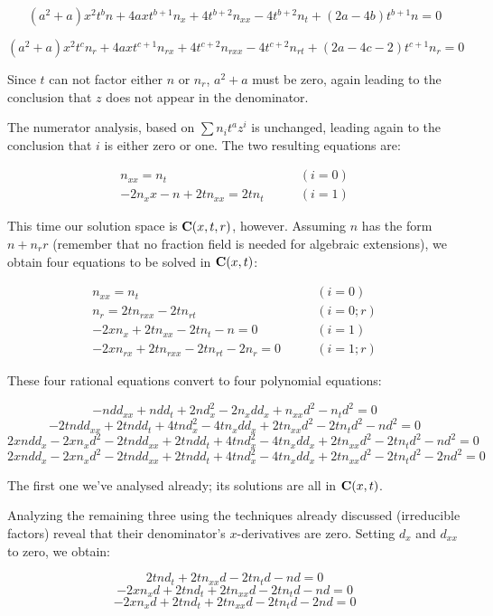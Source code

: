 \documentclass{article}
\newcommand{\C}{\ensuremath{{\bf C}}}
\begin{document}
$$(a^{2} +a)x^{2}t^{b}n +4axt^{b +1}n_{x} +4t^{b +2}n_{xx} -4t^{b +2}n_{t} +(2a -4b)t^{b +1}n = 0$$

$$(a^{2} +a)x^{2}t^{c}n_r +4axt^{c +1}n_{rx} +4t^{c +2}n_{rxx} -4t^{c +2}n_{rt} +(2a -4c -2)t^{c +1}n_r = 0$$

Since $t$ can not factor either $n$ or $n_r$, $a^2+a$ must be zero, again
leading to the conclusion that $z$ does not appear in the denominator.

The numerator analysis, based on $\sum n_i t^a z^i$ is unchanged, leading
again to the conclusion that $i$ is either zero or one.  The two resulting
equations are:

\begin{align*}
n_{xx} = n_t   & \qquad (i=0) \\
-2n_x x - n + 2 t n_{xx} = 2 t n_t  &  \qquad (i=1)
\end{align*}

This time our solution space is $\C(x,t,r)$, however.  Assuming $n$
has the form $n + n_r r$ (remember that no fraction field is needed
for algebraic extensions), we obtain four equations to be solved in $\C(x,t)$:

\begin{align*}
n_{xx} = n_t  & \qquad (i=0) \\
n_r = 2tn_{rxx} -2tn_{rt} & \qquad (i=0; r) \\
-2xn_{x} +2tn_{xx} -2tn_{t} -n = 0 & \qquad (i=1) \\
-2xn_{rx} +2tn_{rxx} -2tn_{rt} -2n_r = 0 & \qquad (i=1; r)
\end{align*}

These four rational equations convert to four polynomial equations:

$$-ndd_{xx} +ndd_t +2nd_x^{2} -2n_xdd_x +n_{xx}d^{2} -n_td^{2} = 0$$
$$-2tndd_{xx} +2tndd_t +4tnd_x^{2} -4tn_xdd_x +2tn_{xx}d^{2} -2tn_td^{2} -nd^{2} = 0$$
$$2xndd_x -2xn_xd^{2} -2tndd_{xx} +2tndd_t +4tnd_x^{2} -4tn_xdd_x +2tn_{xx}d^{2} -2tn_td^{2} -nd^{2} = 0$$
$$2xndd_x -2xn_xd^{2} -2tndd_{xx} +2tndd_t +4tnd_x^{2} -4tn_xdd_x +2tn_{xx}d^{2} -2tn_td^{2} -2nd^{2} = 0$$

The first one we've analysed already; its solutions are all in $\C(x,t)$.

Analyzing the remaining three using the techniques already discussed
(irreducible factors) reveal that their denominator's $x$-derivatives
are zero.  Setting $d_x$ and $d_{xx}$ to zero, we obtain:

$$2tnd_t +2tn_{xx}d -2tn_td -nd = 0$$
$$-2xn_xd +2tnd_t +2tn_{xx}d -2tn_td -nd = 0$$
$$-2xn_xd +2tnd_t +2tn_{xx}d -2tn_td -2nd = 0$$
\end{document}
